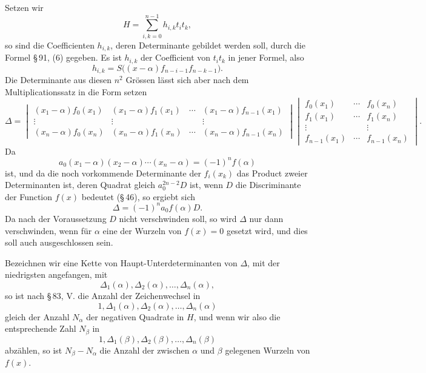 \documentclass[11pt]{article}
\begin{document}
Setzen wir
\[
        H=\sum_{i,k=0}^{n-1}h_{i,k}t_i t_k,
\]
so sind die Coefficienten $h_{i,k}$, deren Determinante gebildet werden soll, durch die Formel \S\,91, (6) gegeben. Es ist $h_{i,k}$ der Coefficient von $t_it_k$ in jener Formel, also
\[
        h_{i,k}=S\bigl((x-\alpha)f_{n-i-1}f_{n-k-1}\bigr).
\]
Die Determinante aus diesen $n^2$ Grössen lässt sich aber nach dem Multiplicationssatz in die Form setzen
\[
\Delta=\begin{vmatrix}
(x_1-\alpha)f_0(x_1)&(x_1-\alpha)f_1(x_1)&\cdots&(x_1-\alpha)f_{n-1}(x_1)\\
\vdots&\vdots&&\vdots\\
(x_n-\alpha)f_0(x_n)&(x_n-\alpha)f_1(x_n)&\cdots&(x_n-\alpha)f_{n-1}(x_n)
\end{vmatrix}
\begin{vmatrix}
f_0(x_1)&\cdots&f_0(x_n)\\
f_1(x_1)&\cdots&f_1(x_n)\\
\vdots&&\vdots\\
f_{n-1}(x_1)&\cdots&f_{n-1}(x_n)
\end{vmatrix}.
\]
Da
\[
        a_0(x_1-\alpha)(x_2-\alpha)\cdots(x_n-\alpha)=(-1)^nf(\alpha)
\]
ist, und da die noch vorkommende Determinante der $f_i(x_k)$ das Product zweier Determinanten ist, deren Quadrat gleich $a_0^{2n-2}D$ ist, wenn $D$ die Discriminante der Function $f(x)$ bedeutet (\S\,46), so ergiebt sich
\begin{equation}
        \Delta=(-1)^n a_0 f(\alpha)D.
\tag{1}
\end{equation}
Da nach der Voraussetzung $D$ nicht verschwinden soll, so wird $\Delta$ nur dann verschwinden, wenn für $\alpha$ eine der Wurzeln von $f(x)=0$ gesetzt wird, und dies soll auch ausgeschlossen sein.

Bezeichnen wir eine Kette von Haupt-Unterdeterminanten von $\Delta$, mit der niedrigsten angefangen, mit
\[
        \Delta_1(\alpha),\Delta_2(\alpha),\ldots,\Delta_n(\alpha),
\]
so ist nach \S\,83, V. die Anzahl der Zeichenwechsel in
\begin{equation}
        1,\Delta_1(\alpha),\Delta_2(\alpha),\ldots,\Delta_n(\alpha)
\tag{2}
\end{equation}
gleich der Anzahl $N_\alpha$ der negativen Quadrate in $H$, und wenn wir also die entsprechende Zahl $N_\beta$ in
\[
        1,\Delta_1(\beta),\Delta_2(\beta),\ldots,\Delta_n(\beta)
\]
abzählen, so ist $N_\beta-N_\alpha$ die Anzahl der zwischen $\alpha$ und $\beta$ gelegenen Wurzeln von $f(x)$.
\end{document}
